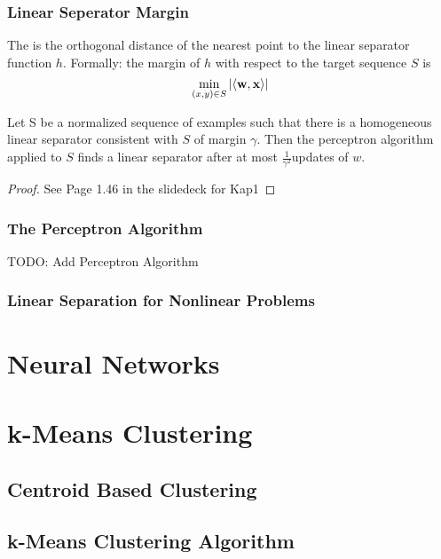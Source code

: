 \subsubsection{Linear Seperator Margin}
The  is the orthogonal distance of the nearest point to the linear separator function $h$. Formally: the margin of $h$ with respect to the target sequence $S$ is
\begin{equation}
\min_{(x, y) \in S}|\langle\mathbf{w}, \mathbf{x}\rangle|
\end{equation} 
\begin{theorem}{}
	Let S  be a normalized sequence of examples such that there is a homogeneous linear separator consistent with $S$ of margin $\gamma$. Then the perceptron algorithm applied to $S$ finds a linear separator after at most $\frac{1}{\gamma^2}$updates of $w$.
\end{theorem}
\begin{proof}{}
	See Page 1.46 in the slidedeck for Kap1
\end{proof}
\subsubsection{The Perceptron Algorithm}
TODO: Add Perceptron Algorithm
\subsubsection{Linear Separation for Nonlinear Problems}
\section{Neural Networks}
\section{k-Means Clustering}
\subsection{Centroid Based Clustering}
\subsection{k-Means Clustering Algorithm}
